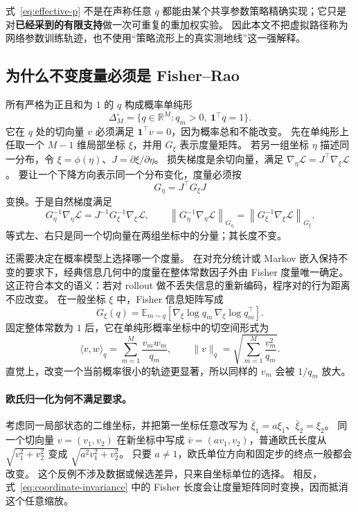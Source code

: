 \documentclass[UTF8,11pt]{ctexart}
\newcommand{\R}{\mathbb{R}}
\begin{document}
式~\eqref{eq:effective-p} 不是在声称任意 $q$ 都能由某个共享参数策略精确实现；它只是对\textbf{已经采到的有限支持}做一次可重复的重加权实验。
因此本文不把虚拟路径称为网络参数训练轨迹，也不使用“策略流形上的真实测地线”这一强解释。

\subsection{为什么不变度量必须是 Fisher--Rao}

所有严格为正且和为 $1$ 的 $q$ 构成概率单纯形
\[
\Delta_M^\circ=\{q\in\R^M:q_m>0,\ \bm 1^\top q=1\}.
\]
它在 $q$ 处的切向量 $v$ 必须满足 $\bm 1^\top v=0$，因为概率总和不能改变。
先在单纯形上任取一个 $M-1$ 维局部坐标 $\xi$，并用 $G_\xi$ 表示度量矩阵。
若另一组坐标 $\eta$ 描述同一分布，令 $\xi=\phi(\eta)$、$J=\partial\xi/\partial\eta$。
损失梯度是余切向量，满足 $\nabla_\eta\mathcal L=J^\top\nabla_\xi\mathcal L$。
要让一个下降方向表示同一个分布变化，度量必须按
\[
G_\eta=J^\top G_\xi J
\]
变换。于是自然梯度满足
\begin{equation}
G_\eta^{-1}\nabla_\eta\mathcal L
=J^{-1}G_\xi^{-1}\nabla_\xi\mathcal L,
\qquad
\left\|G_\eta^{-1}\nabla_\eta\mathcal L\right\|_{G_\eta}
=\left\|G_\xi^{-1}\nabla_\xi\mathcal L\right\|_{G_\xi}.
\label{eq:coordinate-invariance}
\end{equation}
等式左、右只是同一个切向量在两组坐标中的分量；其长度不变。

还需要决定在概率模型上选择哪一个度量。
在对充分统计或 Markov 嵌入保持不变的要求下，经典信息几何中的度量在整体常数因子外由 Fisher 度量唯一确定\cite{Le_2013_FisherUnique}。
这正符合本文的语义：若对 rollout 做不丢失信息的重新编码，程序对的行为距离不应改变。
在一般坐标 $\xi$ 中，Fisher 信息矩阵写成
\[
G_\xi(q)=
\mathbb E_{m\sim q}
\!\left[\nabla_\xi\log q_m\,\nabla_\xi\log q_m^\top\right].
\]
固定整体常数为 $1$ 后，它在单纯形概率坐标中的切空间形式为
\begin{equation}
\langle v,w\rangle_q=\sum_{m=1}^{M}\frac{v_mw_m}{q_m},
\qquad
\lVert v\rVert_q=\sqrt{\sum_{m=1}^{M}\frac{v_m^2}{q_m}}.
\label{eq:fisher-metric}
\end{equation}
直觉上，改变一个当前概率很小的轨迹更显著，所以同样的 $v_m$ 会被 $1/q_m$ 放大。

\paragraph{欧氏归一化为何不满足要求。}
考虑同一局部状态的二维坐标，并把第一坐标任意改写为 $\bar\xi_1=a\xi_1$、$\bar\xi_2=\xi_2$。
同一个切向量 $v=(v_1,v_2)$ 在新坐标中写成 $\bar v=(av_1,v_2)$，普通欧氏长度从
$\sqrt{v_1^2+v_2^2}$ 变成 $\sqrt{a^2v_1^2+v_2^2}$。
只要 $a\ne1$，欧氏单位方向和固定步的终点一般都会改变。
这个反例不涉及数据或候选差异，只来自坐标单位的选择。
相反，式~\eqref{eq:coordinate-invariance} 中的 Fisher 长度会让度量矩阵同时变换，因而抵消这个任意缩放。
\end{document}
